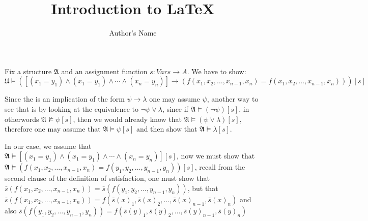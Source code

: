 \documentclass{article}
\begin{document}
\title{Introduction to \LaTeX{}}
\author{Author's Name}

\maketitle

Fix a structure $\mathfrak{A} $  and an assignment function $s : Vars \to A $. We have to show: $\mathfrak{U} \models \left( \left[ \left( x_1= y_1 \right) \land \left( x_1= y_1 \right) \land  \dotsb \land \left( x_n= y_n \right)   \right] \to  \left( f\left(x_{1}, x_{2},  \dots ,x_{n - 1},x_{n} \right) = f\left(x_{1}, x_{2},  \dots ,x_{n - 1},x_{n} \right)  \right)  \right) \left[ s \right]$

Since the is an implication of the form $\psi \to  \lambda$  one may assume $\psi$, another way to see that is by looking at the equivalence to $\neg \psi \lor \lambda$, since if $\mathfrak{A} \models \left( \neg \psi  \right)\left[ s \right]  $, in otherwords $\mathfrak{A} \not \models \psi\left[ s \right]$, then we would already know that $\mathfrak{A}  \models \left( \psi \lor \lambda  \right)\left[ s \right]$, therefore one may assume that $\mathfrak{A} \models \psi\left[ s \right]$ and then show that $\mathfrak{A} \models \lambda\left[ s \right] $.

In our case, we assume that $\mathfrak{A} \models \left[ \left( x_1= y_1 \right) \land \left( x_1= y_1 \right) \land  \dotsb \land \left( x_n= y_n \right)   \right]\left[ s \right] $, now we must show that $\mathfrak{A} \models \left( f\left(x_{1}, x_{2},  \dots ,x_{n - 1},x_{n} \right) = f\left(y_{1}, y_{2},  \dots ,y_{n - 1},y_{n} \right)  \right) \left[ s \right] $, recall from the second clause of the definition of satisfaction, one must show that $\bar{s} \left(f\left(x_{1}, x_{2},  \dots ,x_{n - 1},x_{n} \right) \right) = \bar{s} \left(f\left(y_{1}, y_{2},  \dots ,y_{n - 1},y_{n} \right) \right) $, but that $\bar{s} \left(f\left(x_{1}, x_{2},  \dots ,x_{n - 1},x_{n} \right) \right) = f\left(\bar{s} \left( x \right) _{1}, \bar{s} \left( x \right) _{2},  \dots ,\bar{s} \left( x \right) _{n - 1},\bar{s} \left( x \right) _{n} \right) $ and also $\bar{s} \left(f\left(y_{1}, y_{2},  \dots ,y_{n - 1},y_{n} \right) \right) = f\left(\bar{s} \left( y \right) _{1}, \bar{s} \left( y \right) _{2},  \dots ,\bar{s} \left( y \right) _{ n - 1},\bar{s} \left( y \right) _{n} \right) $
\end{document}

